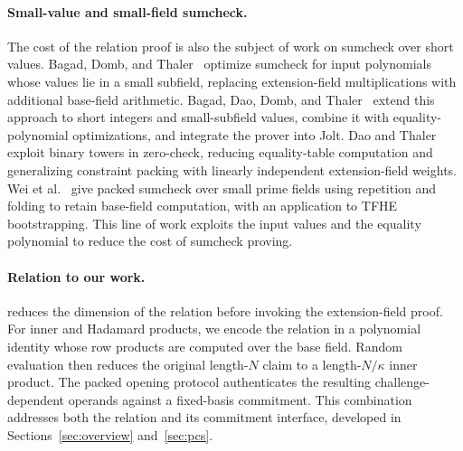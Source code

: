 \paragraph{Small-value and small-field sumcheck.}
The cost of the relation proof is also the subject of work on
sumcheck over short values.
Bagad, Domb, and Thaler~\cite{iacr/BagadDT24} optimize sumcheck
for input polynomials whose values lie in a small subfield, replacing
extension-field multiplications with additional base-field arithmetic.
Bagad, Dao, Domb, and Thaler~\cite{iacr/BagadDDT25} extend this
approach to short integers and small-subfield values, combine it
with equality-polynomial optimizations, and integrate the prover
into Jolt.
Dao and Thaler~\cite{iacr/DaoT24} exploit binary towers in
zero-check, reducing equality-table computation and generalizing
constraint packing with linearly independent extension-field weights.
Wei et al.~\cite{iacr/WeiWXZDWZ25} give packed sumcheck over small
prime fields using repetition and folding to retain base-field
computation, with an application to TFHE bootstrapping.
This line of work exploits the input values and the equality
polynomial to reduce the cost of sumcheck proving.

\paragraph{Relation to our work.}
\methodname reduces the dimension of the relation before invoking
the extension-field proof. For inner and Hadamard products, we
encode the relation in a polynomial identity whose row products
are computed over the base field. Random evaluation then reduces
the original length-\(N\) claim to a length-\(N/\kappa\) inner
product. The packed opening protocol authenticates the resulting
challenge-dependent operands against a fixed-basis commitment.
This combination addresses both the relation and its commitment
interface, developed in Sections~\ref{sec:overview} and~\ref{sec:pcs}.
